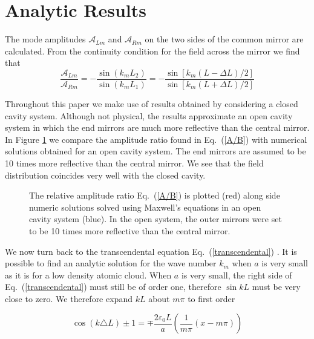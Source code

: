 \documentclass[twocolumn,english,pra,aps,superscriptaddress,floatfix]{revtex4-1}
\begin{document}
\section{Analytic Results}
\label{sec:AnalyticExpressions}



The mode amplitudes $\mathcal{A}_{Lm}$ and $\mathcal{A}_{Rm}$ on the two sides of the common mirror are calculated.  From the continuity condition for the field across the mirror we find that   
\begin{equation}
\frac{\mathcal{A}_{Lm}}{\mathcal{A}_{Rm}}=-\frac{\sin(k_{m}L_{2})}{\sin(k_{m}L_{1})} = -\frac{\sin [k_{m} (L-\Delta L)/2]}{\sin[k_{m}(L+\Delta L)/2]} 
\label{A/B} 
\end{equation}

Throughout this paper we make use of results obtained by considering a closed cavity system.  Although not physical, the results approximate an open cavity system in which the end mirrors are much more reflective than the central mirror.   In  Figure \ref{fig:openvsclosed} we compare the amplitude ratio found in Eq.\ (\ref{A/B}) with numerical solutions obtained for an open cavity system.  The end mirrors are assumed to be 10 times more reflective than the central mirror. We see that the field distribution coincides very well with the closed cavity.


\begin{figure}
\caption{The relative amplitude ratio Eq.\ (\ref{A/B}) is plotted (red) along side numeric solutions solved using Maxwell's equations in an open cavity system (blue).  In the open system, the outer mirrors were set to be 10 times more reflective than the central mirror.}
\label{fig:openvsclosed}
\end{figure}

We now turn back to the transcendental equation Eq.\ (\ref{transcendental}) . It is possible to find an analytic solution for the wave number $k_{m}$ when $a$
is very small as it is for a low density atomic cloud. When $a$ is very small, the right side of Eq.\ (\ref{transcendental}) must still
be of order one, therefore $\sin kL$ must be very close to zero. We therefore expand $kL$ about $m\pi$ to first order 

\begin{equation}
\cos(k\triangle L)\pm1=\mp\frac{2\varepsilon_{0}L}{a}\left(\frac{1}{m\pi}\left(x-m\pi\right)\right)
\label{transcendental2}
\end{equation}
\end{document}
